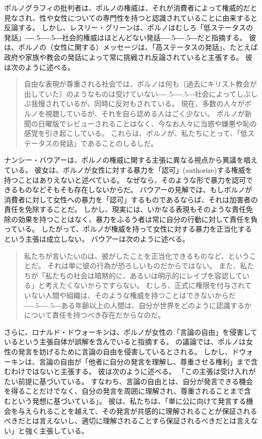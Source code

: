 \documentclass[paper=a4,book,openany]{jlreq}
\newcommand{\ig}[1]{}           %
\def\DDASH{―\kern-.5\zw―\kern-.5\zw―}
\begin{document}
ポルノグラフィの批判者は、ポルノの権威は、それが消費者によって権威的だと見なされ、性や女性についての専門性を持つと認識されていることに由来すると反論する\citep[p.430]{langton12:_respon}。
しかし、レスリー・グリーン\ig{Leslie Green}は、ポルノはむしろ「低ステータスの発話」{\DDASH}社会的権威はほとんどない発話{\DDASH}だと指摘する。
彼は、ポルノの（女性に関する）メッセージは、「高ステータスの発話」、たとえば政府や家族や教会の発話によって常に挑戦され反論されていると主張する。
彼は次のように述べる。

\begin{quote}
自由な表現が尊重される社会では、ポルノは何も〔過去にキリスト教会が出していた〕のようなものは受けていない{\DDASH}社会によってしぶしぶ我慢されているが、同時に反対もされている。
現在、多数の人々がポルノを視聴しているが、それを自ら認める人はごく少ない。
ポルノが新聞の日曜版でレビューされることはなく、今なお人々に当惑や嫌悪や恥の感覚を引き起こしている。
これらは、ポルノが、私たちにとって、「低ステータスの発話」であることのしるしだ。
\citep[pp.296--297]{green98:_pornog_subor_silen}
\end{quote}

ナンシー・バウアーは、ポルノの権威に関する主張に異なる視点から異議を唱えている。
彼女は、ポルノが女性に対する暴力を「認可」(authorize)する権威を持つことはありえないと述べている。
なぜなら、そのような形で暴力を認可できるものなどそもそも存在しないからだ。
バウアーの見解では、もしポルノが消費者に対して女性への暴力を「認可」するものであるならば、それは加害者の責任を免除することだ。
しかし、現実には、いかなる表現もそのような責任免除の効果を持つことはなく、暴力をふるう者は常に自分の行動に対して責任を負っている。
したがって、ポルノが権威を持って女性に対する暴力を正当化するという主張は成立しない。
バウアーは次のように述べる。

\begin{quote}
私たちが言いたいのは、彼がしたことを正当化できるものなど、ということだ。
それは単に彼の行為が恐ろしいものだからではない。
また、私たちが「私たちの社会は暗黙的に、あるいは明示的にレイプを容認している」と考えたくないからですらない。
むしろ、正式に権限を付与されていない人間や組織は、そのような権威を持つことはできないからだ{\DDASH}ある年齢以上の人間は、自分が世界をどのように認識するかについて責任を持つべき存在だからなのだ。
\citep[pp.86--87]{bauer06:_how_do_thing_pornog}
\end{quote}

さらに、ロナルド・ドウォーキン\ig{Ronald Dworkin}は、ポルノが女性の「言論の自由」を侵害しているという主張自体が誤解を含んでいると指摘する。
の議論では、ポルノは女性の発言を妨げるために言論の自由を侵害しているとされる。
しかし、ドウォーキン\ig{Ronald Dworkin}は、言論の自由が「他者に自分の発言を理解し、尊重させる権利」まで含むわけではないと主張する。
彼は次のように述べる。
「この主張は受け入れがたい前提に基づいている。
すなわち、言論の自由とは、自分が発言できる機会を得ることだけでなく、自分の発言を周囲に理解され、尊重されることまで含むという発想に基づいている」。
彼は、私たちは、「単に公に向けて発言する機会を与えられることを越えて、その発言が共感的に理解されることが保証されるべきだとは言えないし、適切に理解されることすら保証されるべきだとは言えない」と強く主張している\citep[p.232]{dworkin96:_freed_law}。
\end{document}
